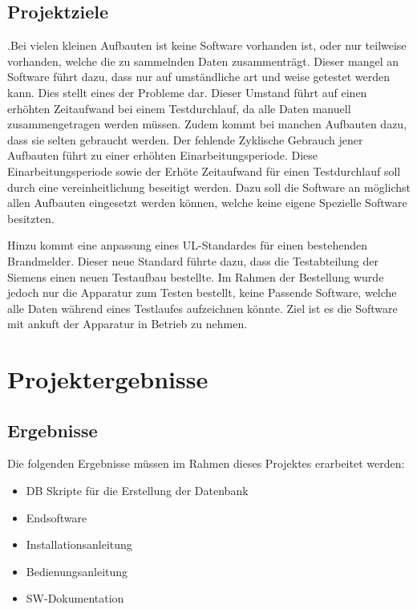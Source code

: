 \documentclass[10pt]{scrartcl}
\begin{document}
\subsection{Projektziele}
.Bei vielen kleinen Aufbauten ist keine Software vorhanden ist, oder nur teilweise vorhanden, welche die zu sammelnden Daten zusammenträgt. Dieser mangel an Software führt dazu, dass nur auf umständliche art und weise getestet werden kann. Dies stellt eines der Probleme dar. Dieser Umstand führt auf einen erhöhten Zeitaufwand bei einem Testdurchlauf, da alle Daten manuell zusammengetragen werden müssen. Zudem kommt bei manchen Aufbauten dazu, dass sie selten gebraucht werden. Der fehlende Zyklische Gebrauch jener Aufbauten führt zu einer erhöhten Einarbeitungsperiode. Diese Einarbeitungsperiode sowie der Erhöte Zeitaufwand für einen Testdurchlauf soll durch eine vereinheitlichung beseitigt werden. Dazu soll die Software an möglichst allen Aufbauten eingesetzt werden können, welche keine eigene Spezielle Software besitzten.

Hinzu kommt eine anpassung eines UL-Standardes für einen bestehenden Brandmelder. Dieser neue Standard führte dazu, dass die Testabteilung der Siemens einen neuen Testaufbau bestellte. Im Rahmen der Bestellung wurde jedoch nur die Apparatur zum Testen bestellt, keine Passende Software, welche alle Daten während eines Testlaufes aufzeichnen könnte. Ziel ist es die Software mit ankuft der Apparatur in Betrieb zu nehmen.
\section{Projektergebnisse}
\subsection{Ergebnisse}
Die folgenden Ergebnisse müssen im Rahmen dieses Projektes erarbeitet werden:
\begin{itemize}
	\item DB Skripte für die Erstellung der Datenbank
	\item Endsoftware
	\item Installationsanleitung
	\item Bedienungsanleitung
	\item SW-Dokumentation
\end{itemize}
\end{document}
